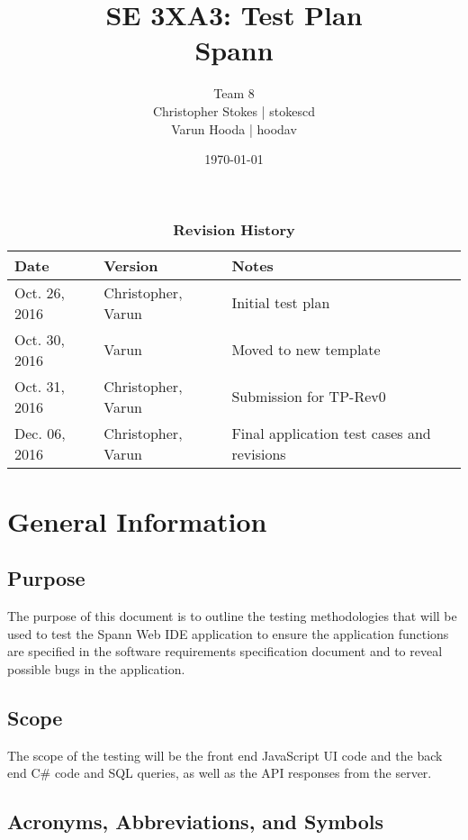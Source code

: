 \documentclass[12pt, titlepage]{article}
\title{SE 3XA3: Test Plan\\Spann}
\author{Team 8
		\\ Christopher Stokes | stokescd
		\\ Varun Hooda | hoodav
}
\date{\today}
\begin{document}
\maketitle

\tableofcontents
\listoftables

\begin{table}[bp]
\caption{\bf Revision History}
\begin{tabularx}{\textwidth}{p{3cm}p{2cm}X}
\toprule {\bf Date} & {\bf Version} & {\bf Notes}\\
\midrule
    Oct. 26, 2016 & Christopher, Varun & Initial test plan\\
    Oct. 30, 2016 & Varun & Moved to new template\\
    Oct. 31, 2016 & Christopher, Varun & Submission for TP-Rev0\\
		Dec. 06, 2016	& Christopher, Varun & Final application test cases and
			revisions\\
\bottomrule
\end{tabularx}
\end{table}

\newpage


\section{General Information}

\subsection{Purpose}
The purpose of this document is to outline the testing methodologies that will
be used to test the Spann Web IDE application to ensure the application
functions are specified in the software requirements specification document and
to reveal possible bugs in the application.

\subsection{Scope}
The scope of the testing will be the front end JavaScript UI code and the back
end C\# code and SQL queries, as well as the API responses from the server.

\subsection{Acronyms, Abbreviations, and Symbols}
	
\end{document}

